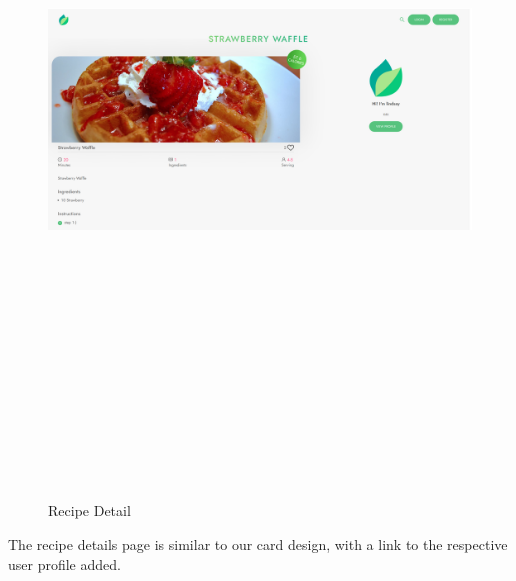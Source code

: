 \begin{figure}[!hb]
\centering
\caption[Recipe Detail]{Recipe Detail}%
\label{fig:recipe_detail}
\includegraphics[width=\linewidth,height=20cm,keepaspectratio]{img/recipe_detail}
\end{figure}

The recipe details page is similar to our card design, with a link to the respective user profile added. 


